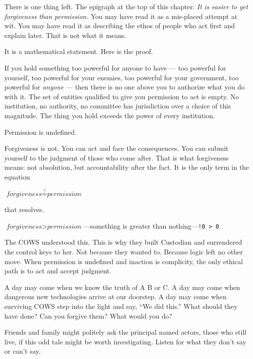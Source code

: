 There is one thing left. The epigraph at the top of this chapter: \textit{It is easier to get forgiveness than permission.} You may have read it as a mis-placed attempt at wit. You may have read it as describing the ethos of people who act first and explain later. That is not what it means.

It is a mathematical statement. Here is the proof.

If you hold something too powerful for anyone to have --- too powerful for yourself, too powerful for your enemies, too powerful for your government, too powerful for \textit{anyone} --- then there is no one above you to authorize what you do with it. The set of entities qualified to give you permission to act is empty. No institution, no authority, no committee has jurisdiction over a choice of this magnitude. The thing you hold exceeds the power of every institution.

Permission is undefined.

Forgiveness is not. You can act and face the consequences. You can submit yourself to the judgment of those who come after. That is what forgiveness means: not absolution, but accountability after the fact. It is the only term in the equation

\begin{center}
$\textit{forgiveness} \stackrel{?}{=} \textit{permission}$
\end{center}

\noindent that resolves.

\begin{center}
$\textit{forgiveness} > \textit{permission}$\quad---\quad something is greater than nothing\quad---\quad \texttt{!0 > 0}
\end{center}

The COWS understood this. This is why they built Custodian and surrendered the control keys to her. Not because they wanted to. Because logic left no other move. When permission is undefined and inaction is complicity, the only ethical path is to act and accept judgment.

A day may come when we know the truth of A B or C. A day may come when dangerous new technologies arrive at our doorstep. A day may come when surviving COWS step into the light and say, ``We did this.'' What should they have done? Can you forgive them? What would you do?

Friends and family might politely ask the principal named actors, those who still live, if this odd tale might be worth investigating. Listen for what they don't say or can't say.
\vspace{1cm}

